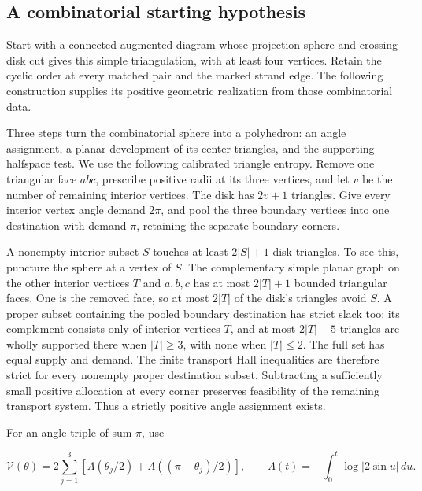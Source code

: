 \subsection{A combinatorial starting hypothesis}\label{bl:a-combinatorial-starting-hypothesis}

Start with a connected augmented diagram whose projection-sphere and
crossing-disk cut gives this simple triangulation, with at least four
vertices. Retain the cyclic order at every matched pair and the marked
strand edge. The following construction supplies its positive geometric
realization from those combinatorial data.

Three steps turn the combinatorial sphere into a polyhedron: an
angle assignment, a planar development of its center triangles, and
the supporting-halfspace test. We use the following calibrated
triangle entropy. Remove one triangular
face \(abc\), prescribe positive radii at its three vertices, and let
\(v\) be the number of remaining interior vertices. The disk has
\(2v+1\) triangles. Give every interior vertex angle demand \(2\pi\),
and pool the three boundary vertices into one destination with demand
\(\pi\), retaining the separate boundary corners.

A nonempty interior subset \(S\) touches at least \(2|S|+1\) disk triangles.
To see this, puncture the sphere at a vertex of \(S\). The complementary
simple planar graph on the other interior vertices \(T\) and \(a,b,c\)
has at most \(2|T|+1\) bounded triangular faces. One is the removed
face, so at most \(2|T|\) of the disk's triangles avoid \(S\).
A proper subset containing the pooled boundary destination has strict
slack too: its complement consists only of interior vertices \(T\),
and at most \(2|T|-5\) triangles are wholly supported there when
\(|T|\ge3\), with none when \(|T|\le2\). The full set has equal
supply and demand. The finite transport Hall inequalities are therefore
strict for every nonempty proper destination subset. Subtracting a sufficiently
small positive allocation at every corner preserves feasibility of the
remaining transport system. Thus a strictly positive angle assignment
exists.

For an angle triple of sum \(\pi\), use

\begin{equation}\label{bl:G0}
\mathcal V(\theta)=2\sum_{j=1}^3
 [\Lambda(\theta_j/2)+\Lambda((\pi-\theta_j)/2)],
 \qquad \Lambda(t)=-\int_0^t\log|2\sin u|\,du .
\end{equation}

